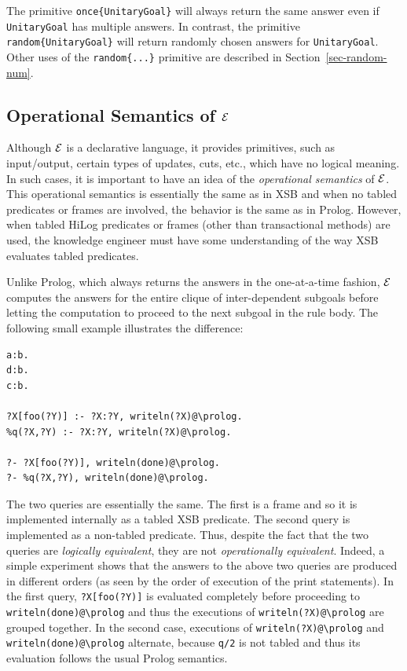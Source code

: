 \documentclass[11pt]{article}
\newcommand{\ERGO}{\mbox{\ensuremath{\cal{E}}\smaller{{\sc{RGO}}}}\xspace}
\newcommand{\FLSYSTEM}{\ERGO}
\newcommand{\bs}{\textbackslash}
\begin{document}
The primitive \texttt{once\{UnitaryGoal\}}
will always return the same answer
even if  \texttt{UnitaryGoal} has multiple answers.
In contrast, the primitive \texttt{random\{UnitaryGoal\}}
will return randomly chosen answers for \texttt{UnitaryGoal}. 
Other uses of the \texttt{random\{...\}} primitive are described in
Section~\ref{sec-random-num}. 



\subsection{Operational Semantics of \FLSYSTEM}\label{sec-flora-operational}

Although \FLSYSTEM is a declarative language, it provides primitives, such as
input/output, certain types of updates, cuts, etc., which have no logical
meaning. In such cases, it is important to have an idea of the
\emph{operational semantics} of \FLSYSTEM. This operational semantics is
essentially the same as in XSB and when no tabled predicates or frames
are involved, the behavior is the same as in Prolog. However, when tabled
HiLog predicates or frames (other than transactional methods) are used,
the knowledge engineer must have some understanding of the way XSB evaluates tabled
predicates.

Unlike Prolog, which always returns the answers in the one-at-a-time
fashion, \FLSYSTEM computes the
answers for the entire clique of inter-dependent
subgoals before letting the computation to proceed to the next subgoal
in the rule body. The following small example illustrates the difference:
\begin{verbatim}
a:b.
d:b.
c:b.

?X[foo(?Y)] :- ?X:?Y, writeln(?X)@\prolog.
%q(?X,?Y) :- ?X:?Y, writeln(?X)@\prolog.

?- ?X[foo(?Y)], writeln(done)@\prolog.
?- %q(?X,?Y), writeln(done)@\prolog.
\end{verbatim}
The two queries are essentially the same. The first is a frame
and so it is implemented internally as a tabled XSB predicate. The
second query is implemented as a non-tabled predicate.  Thus, despite
the fact that the two queries are \emph{logically equivalent}, they are
not \emph{operationally equivalent}.  Indeed, a
simple experiment shows that the answers to the above two queries are
produced in different orders (as seen by the order of execution of the
print statements).  In the first query, \verb|?X[foo(?Y)]| is evaluated
completely before proceeding to {\tt writeln(done)@\bs{}prolog} and thus
the executions of {\tt writeln(?X)@\bs{}prolog} are grouped together. In the
second case, executions of {\tt writeln(?X)@\bs{}prolog} and {\tt
writeln(done)@\bs{}prolog} alternate, because {\tt \verb|q|/2} is not tabled
and thus its evaluation follows the usual Prolog semantics.
\end{document}
